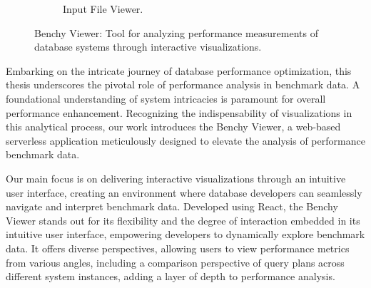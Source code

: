 \begin{figure}[h]
\begin{subfigure}[b]{0.3\linewidth}
      \caption{Input File Viewer.}
        \label{fig:abstract-data-viewer}
    \end{subfigure}
    \caption{Benchy Viewer: Tool for analyzing performance measurements of database systems through interactive visualizations.}
    \label{fig:abstract}
  \end{figure}





Embarking on the intricate journey of database performance optimization, this thesis underscores the pivotal role of performance analysis in benchmark data. A foundational understanding of system intricacies is paramount for overall performance enhancement. Recognizing the indispensability of visualizations in this analytical process, our work introduces the Benchy Viewer, a web-based serverless application meticulously designed to elevate the analysis of performance benchmark data.

Our main focus is on delivering interactive visualizations through an intuitive user interface, creating an environment where database developers can seamlessly navigate and interpret benchmark data. Developed using React, the Benchy Viewer stands out for its flexibility and the degree of interaction embedded in its intuitive user interface, empowering developers to dynamically explore benchmark data. It offers diverse perspectives, allowing users to view performance metrics from various angles, including a comparison perspective of query plans across different system instances, adding a layer of depth to performance analysis.

